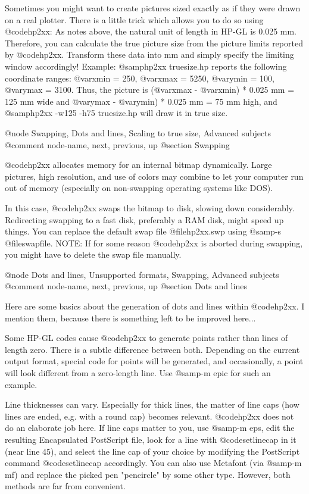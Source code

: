Sometimes you might want to create pictures sized exactly as if they
were drawn on a real plotter. There is a little trick which allows
you to do so using @code{hp2xx}: As notes above, the natural unit of
length in HP-GL is 0.025 mm. Therefore, you can calculate the true
picture size from the picture limits reported by @code{hp2xx}. Transform
these data into mm and simply specify the limiting window accordingly!
Example:
@samp{hp2xx truesize.hp} reports the following coordinate ranges:
@var{xmin} = 250, @var{xmax} = 5250, @var{ymin} = 100, @var{ymax} = 3100.
Thus, the picture is (@var{xmax} - @var{xmin}) * 0.025 mm = 125 mm wide
and @var{ymax} - @var{ymin}) * 0.025 mm = 75 mm high, and
@samp{hp2xx -w125 -h75 truesize.hp} will draw it in true size.




@node Swapping, Dots and lines, Scaling to true size, Advanced subjects
@comment  node-name,  next,  previous,  up
@section Swapping

@code{hp2xx} allocates memory for an internal bitmap dynamically.
Large pictures, high resolution, and use of colors may combine to
let your computer run out of memory (especially on non-swapping operating
systems like DOS).

In this case, @code{hp2xx} swaps the bitmap to disk, slowing down
considerably. Redirecting swapping to a fast disk, preferably a RAM disk,
might speed up things. You can replace the default swap file
@file{hp2xx.swp} using @samp{-s @file{swapfile}}.
NOTE: If for some reason @code{hp2xx} is aborted during swapping, you might
have to delete the swap file manually.





@node Dots and lines, Unsupported formats, Swapping, Advanced subjects
@comment  node-name,  next,  previous,  up
@section Dots and lines

Here are some basics about the generation of dots and lines within
@code{hp2xx}. I mention them, because there is something left to be
improved here...

Some HP-GL codes cause @code{hp2xx} to generate points rather than lines
of length zero. There is a subtle difference between both. Depending
on the current output format, special code for points will be generated,
and occasionally, a point will look different from a zero-length line.
Use @samp{-m epic} for such an example.

Line thicknesses can vary. Especially for thick lines, the matter of
line caps (how lines are ended, e.g. with a round cap) becomes relevant.
@code{hp2xx} does not do an elaborate job here. If line caps matter to you,
use @samp{-m eps}, edit the resulting Encapsulated PostScript file, look
for a line with @code{setlinecap} in it (near line 45), and select the
line cap of your choice by modifying the PostScript command @code{setlinecap}
accordingly. You can also use Metafont (via @samp{-m mf}) and replace
the picked pen "pencircle" by some other type. However, both methods
are far from convenient.

